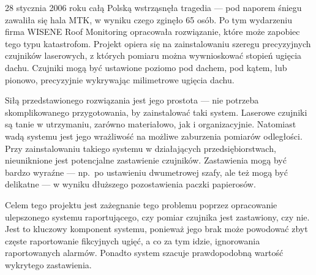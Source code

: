 28 stycznia 2006 roku całą Polską wstrząsnęła tragedia — pod naporem śniegu zawaliła się hala MTK, w wyniku czego
zginęło 65 osób.
Po tym wydarzeniu firma WISENE Roof Monitoring opracowała rozwiązanie, które może zapobiec tego
typu katastrofom.
Projekt opiera się na zainstalowaniu szeregu precyzyjnych czujników laserowych, z których pomiaru można wywnioskować stopień ugięcia dachu.
Czujniki mogą być ustawione poziomo pod dachem, pod kątem, lub pionowo, precyzyjnie wykrywając milimetrowe ugięcia dachu.

Siłą przedstawionego rozwiązania jest jego prostota — nie potrzeba skomplikowanego przygotowania, by zainstalować taki system.
Laserowe czujniki są tanie w utrzymaniu, zarówno materiałowo, jak i organizacyjnie.
Natomiast wadą systemu jest jego wrażliwość na możliwe zaburzenia pomiarów odległości.
Przy zainstalowaniu takiego systemu w działających przedsiębiorstwach, nieuniknione jest potencjalne zastawienie czujników.
Zastawienia mogą być bardzo wyraźne — np.\ po ustawieniu dwumetrowej szafy, ale też mogą być delikatne — w wyniku dłuższego pozostawienia paczki papierosów.

Celem tego projektu jest zażegnanie tego problemu poprzez opracowanie ulepszonego systemu raportującego, czy pomiar czujnika jest zastawiony, czy nie.
Jest to kluczowy komponent systemu, ponieważ jego brak może powodować zbyt częste raportowanie fikcyjnych ugięć, a co za tym idzie, ignorowania raportowanych alarmów.
Ponadto system szacuje prawdopodobną wartość wykrytego zastawienia.